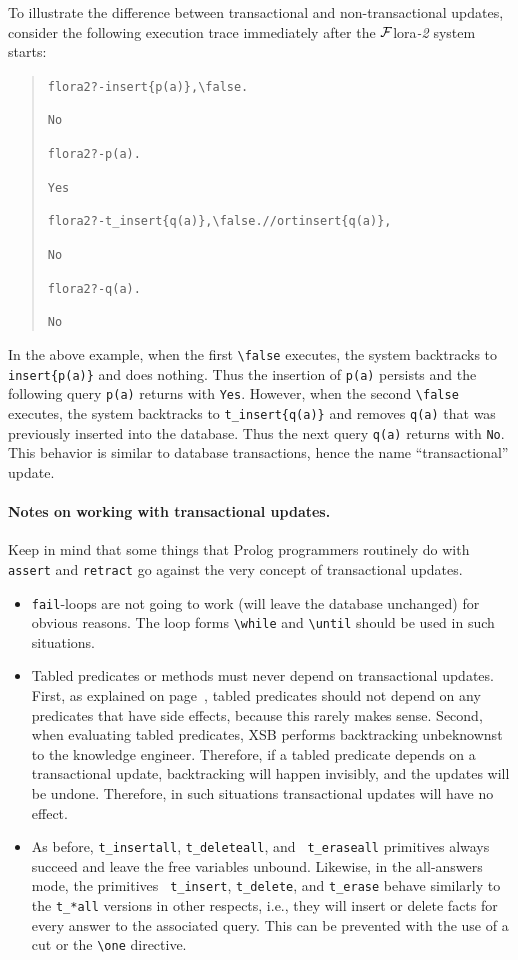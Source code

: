 \documentclass[11pt]{article}
\newcommand{\FLORA}{{\mbox{\sc ${\cal F}${lora}\rm\emph{-2}}}\xspace}
\newcommand{\FLSYSTEM}{\FLORA}
\newcommand{\prompt}{flora2 ?- }
\newcommand{\bs}{\textbackslash}
\begin{document}
To illustrate the difference between transactional and
non-transactional updates, consider the following execution trace
immediately after the \FLSYSTEM system starts:
\begin{quote}
\begin{alltt}
\prompt insert\{p(a)\}, \bs{}false.

No

\prompt p(a).

Yes

\prompt t_insert\{q(a)\}, \bs{}false.   // or tinsert\{q(a)\},

No

\prompt q(a).

No
\end{alltt}
\end{quote}
In the above example, when the first \verb|\false| executes, the system
backtracks to {\tt insert\{p(a)\}} and does nothing. Thus the insertion
of {\tt p(a)} persists and the following query \verb|p(a)| returns
with {\tt Yes}. However, when the second \verb|\false| executes, the
system backtracks to {\tt t\_insert\{q(a)\}} and removes {\tt q(a)} that
was previously inserted into the database. Thus the next query
\verb|q(a)| returns with {\tt No}. This behavior is similar to database
transactions, hence the name ``transactional'' update.

\paragraph{Notes on working with transactional updates.}
Keep in mind that some things that Prolog programmers routinely do with
{\tt assert} and {\tt retract} go against the very concept of
transactional updates.
\begin{itemize}
  \item
    {\tt fail}-loops are not going to
    work (will leave the database unchanged) for obvious reasons. The loop forms
    {\tt \bs{}while} and {\tt \bs{}until} should be used in such situations.
  \item Tabled predicates or methods must never depend on transactional
    updates. First, as explained on page~\pageref{page-depchk},
    tabled predicates should not depend on any predicates that have side
    effects, because this rarely makes sense. Second, when evaluating
    tabled predicates, XSB performs backtracking unbeknownst to the
    knowledge engineer. Therefore, if a tabled predicate depends on a
    transactional update, backtracking will happen invisibly, and the
    updates will be undone. Therefore, in such situations transactional
    updates will have no effect.
    
  \item As before, {\tt t\_insertall}, {\tt t\_deleteall}, and {\tt
      t\_eraseall} primitives always succeed and leave the free variables
    unbound.  Likewise, in the all-answers mode, the primitives {\tt
      t\_insert}, {\tt t\_delete}, and {\tt t\_erase} behave similarly to the
    {\tt t\_*all} versions in other respects, i.e., they will insert
    or delete facts for every answer to the associated query. This can be
    prevented with the use of a cut or the {\tt \bs{}one} directive.
\end{itemize}
\end{document}
